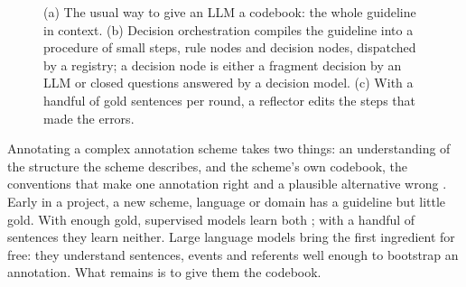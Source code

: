\begin{figure}[t]
{}
\caption{(a) The usual way to give an LLM a codebook: the whole guideline in context. (b) Decision orchestration compiles the guideline into a procedure of small steps, rule nodes and decision nodes, dispatched by a registry; a decision node is either a fragment decision by an LLM or closed questions answered by a decision model. (c) With a handful of gold sentences per round, a reflector edits the steps that made the errors.}
\label{fig:overview}
\end{figure}

Annotating a complex annotation scheme takes two things: an understanding of the structure the scheme describes, and the scheme's own codebook, the conventions that make one annotation right and a plausible alternative wrong \citep{kim2026refining}. Early in a project, a new scheme, language or domain has a guideline but little gold. With enough gold, supervised models learn both \citep{bevilacqua2021spring,bai2022graph}; with a handful of sentences they learn neither. Large language models bring the first ingredient for free: they understand sentences, events and referents well enough to bootstrap an annotation. What remains is to give them the codebook.

